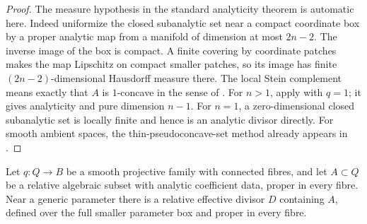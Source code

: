 \begin{proof}
The measure hypothesis in the standard analyticity theorem is automatic here. Indeed uniformize the closed subanalytic set near a compact coordinate box by a proper analytic map from a manifold of dimension at most $2n-2$. The inverse image of the box is compact. A finite covering by coordinate patches makes the map Lipschitz on compact smaller patches, so its image has finite $(2n-2)$-dimensional Hausdorff measure there. The local Stein complement means exactly that $A$ is $1$-concave in the sense of \cite[Definition 1]{Vajaitu2000}. For $n>1$, apply \cite[Theorem 1]{Vajaitu2000} with $q=1$; it gives analyticity and pure dimension $n-1$. For $n=1$, a zero-dimensional closed subanalytic set is locally finite and hence is an analytic divisor directly. For smooth ambient spaces, the thin-pseudoconcave-set method already appears in \cite[Theorem~1.4]{Hirschowitz1973}.
\end{proof}

\begin{lemma}
\label{lem:holes-relative-divisor-container}
Let $q:Q\to B$ be a smooth projective family with connected fibres, and let $A\subset Q$ be a relative algebraic subset with analytic coefficient data, proper in every fibre. Near a generic parameter there is a relative effective divisor $D$ containing $A$, defined over the full smaller parameter box and proper in every fibre.
\end{lemma}


